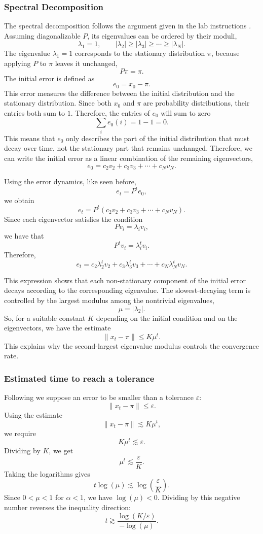 \subsubsection{Spectral Decomposition}
The spectral decomposition follows the argument given in the lab instructions \cite{figueras2026lab03}. Assuming diagonalizable \(P\), its eigenvalues can be ordered by their moduli,
\[
\lambda_1=1, \qquad |\lambda_2|\geq |\lambda_3| \geq \cdots \geq |\lambda_N|.
\]
The eigenvalue \(\lambda_1=1\) corresponds to the stationary distribution \(\pi\), because applying \(P\) to \(\pi\) leaves it unchanged,
\[
P\pi=\pi.
\]
The initial error is defined as
\[
e_0=x_0-\pi.
\]
This error measures the difference between the initial distribution and the stationary distribution. Since both \(x_0\) and \(\pi\) are probability distributions, their entries both sum to \(1\). Therefore, the entries of \(e_0\) will sum to zero
\[
\sum_i e_0(i)=1-1=0.
\]
This means that \(e_0\) only describes the part of the initial distribution that must decay over time, not the stationary part that remains unchanged.
Therefore, we can write the initial error as a linear combination of the remaining eigenvectors,
\[
e_0=c_2v_2+c_3v_3+\cdots+c_Nv_N.
\]

Using the error dynamics, like seen before,
\[
e_t=P^t e_0,
\]
we obtain
\[
e_t=P^t(c_2v_2+c_3v_3+\cdots+c_Nv_N).
\]
Since each eigenvector satisfies the condition
\[
Pv_i=\lambda_i v_i,
\]
we have that
\[
P^t v_i=\lambda_i^t v_i.
\]
Therefore,
\[
e_t=c_2\lambda_2^t v_2+c_3\lambda_3^t v_3+\cdots+c_N\lambda_N^t v_N.
\]

This expression shows that each non-stationary component of the initial error decays according to the corresponding eigenvalue. The slowest-decaying term is controlled by the largest modulus among the nontrivial eigenvalues,
\[
\mu=|\lambda_2|.
\]
So, for a suitable constant \(K\) depending on the initial condition and on the eigenvectors, we have the estimate
\[
\|x_t-\pi\| \leq K\mu^t.
\]
This explains why the second-largest eigenvalue modulus controls the convergence rate.


\subsubsection{Estimated time to reach a tolerance}

Following \cite{figueras2026lab03} we suppose an error to be smaller than a tolerance \(\varepsilon\):
\[
\|x_t-\pi\|\leq \varepsilon.
\]
Using the estimate
\[
\|x_t-\pi\|\lesssim K\mu^t,
\]
we require
\[
K\mu^t \lesssim \varepsilon.
\]
Dividing by \(K\), we get
\[
\mu^t \lesssim \frac{\varepsilon}{K}.
\]
Taking the logarithms gives
\[
t\log(\mu) \lesssim \log\left(\frac{\varepsilon}{K}\right).
\]
Since \(0<\mu<1\) for $\alpha<1$, we have \(\log(\mu)<0\). Dividing by this negative number reverses the inequality direction:
\[
t \gtrsim \frac{\log(K/\varepsilon)}{-\log(\mu)}.
\]

